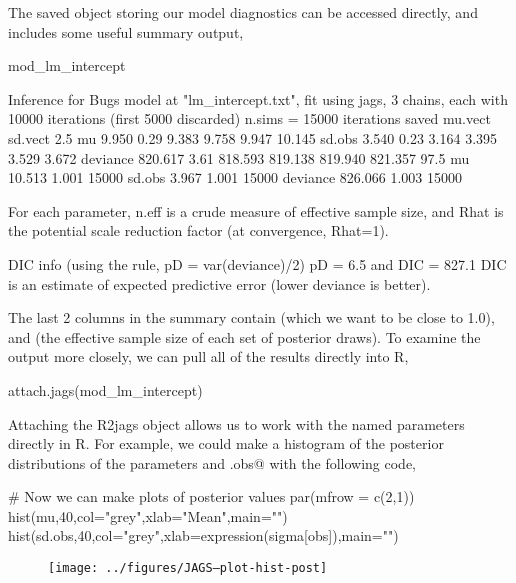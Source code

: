 The saved object storing our model diagnostics can be accessed directly, and includes some useful summary output,
\begin{Schunk}
\begin{Sinput}
 mod_lm_intercept
\end{Sinput}
\begin{Soutput}
Inference for Bugs model at "lm_intercept.txt", fit using jags,
 3 chains, each with 10000 iterations (first 5000 discarded)
 n.sims = 15000 iterations saved
         mu.vect sd.vect    2.5%     25%     50%     75%
mu         9.950    0.29   9.383   9.758   9.947  10.145
sd.obs     3.540    0.23   3.164   3.395   3.529   3.672
deviance 820.617    3.61 818.593 819.138 819.940 821.357
           97.5%  Rhat n.eff
mu        10.513 1.001 15000
sd.obs     3.967 1.001 15000
deviance 826.066 1.003 15000

For each parameter, n.eff is a crude measure of effective sample size,
and Rhat is the potential scale reduction factor (at convergence, Rhat=1).

DIC info (using the rule, pD = var(deviance)/2)
pD = 6.5 and DIC = 827.1
DIC is an estimate of expected predictive error (lower deviance is better).
\end{Soutput}
\end{Schunk}

The last 2 columns in the summary contain \verb@Rhat@ (which we want to be close to 1.0), and \verb@neff@ (the effective sample size of each set of posterior draws). To examine the output more closely, we can pull all of the results directly into R,

\begin{Schunk}
\begin{Sinput}
 attach.jags(mod_lm_intercept)
\end{Sinput}
\end{Schunk}

Attaching the R2jags object allows us to work with the named parameters directly in R. For example, we could make a histogram of the posterior distributions of the parameters \verb@mu@ and \verb@sd.obs@ with the following code,

\begin{Schunk}
\begin{Sinput}
 # Now we can make plots of posterior values
 par(mfrow = c(2,1))
 hist(mu,40,col="grey",xlab="Mean",main="")
 hist(sd.obs,40,col="grey",xlab=expression(sigma[obs]),main="")
\end{Sinput}
\end{Schunk}
\begin{figure}[htp]
\begin{center}
\texttt{[image: ../figures/JAGS--plot-hist-post]}
\end{center}
\caption{}
\label{fig:posteriors.lm.intercept}
\end{figure}

